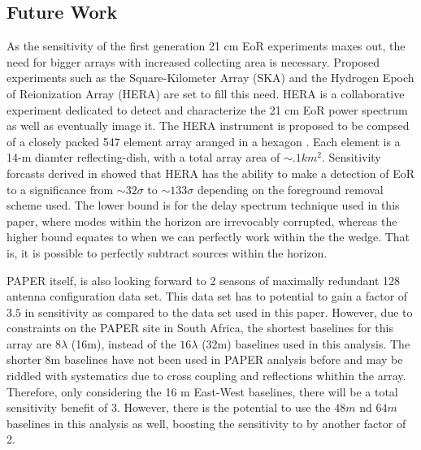 \documentclass[twocolumn,numberedappendix]{emulateapj} \shorttitle{PSA64}
\begin{document}
\subsection{Future Work}
As the sensitivity of the first generation 21 cm EoR experiments maxes out, the
need for bigger arrays with increased collecting area is necessary. Proposed
experiments such as the Square-Kilometer Array (SKA) and the Hydrogen Epoch of
Reionization Array (HERA) are set to fill this need. HERA is a collaborative
experiment dedicated to detect and characterize the 21 cm EoR power spectrum as
well as eventually image it. The HERA instrument is proposed to be compsed of a
closely packed 547 element array aranged in a hexagon \citep{pober_et_al2014}.
Each element is a 14-m diamter reflecting-dish, with a total array area of
$\sim.1km^{2}$. Sensitivity forcasts derived in \cite{pober_et_al2014}
showed that HERA has the ability to make a detection of EoR to a significance
from $\sim32\sigma$ to $\sim133\sigma$ depending on the foreground removal
scheme used. The lower bound is for the delay spectrum technique used in this
paper, where modes within the horizon are irrevocably corrupted, whereas the
higher bound equates to when we can perfectly work within the the wedge. That
is, it is possible to perfectly subtract sources within the horizon.

PAPER itself, is also looking forward to 2 seasons of maximally redundant 128
antenna configuration  data set. This data set has to potential to gain a factor
of $3.5$ in sensitivity as compared to the data set used in this paper. However,
due to constraints on the PAPER site in South Africa, the shortest baselines for
this array are $8\lambda$ (16m), instead of the $16\lambda$ (32m) baselines used
in this analysis. The shorter 8m baselines have not been used in PAPER analysis
before and may be riddled with systematics due to cross coupling and reflections
whithin the array. Therefore, only considering the 16 m East-West baselines,
there will be a total sensitivity benefit of $3$. However, there is the
potential to use the $48m$ nd $64m$ baselines in this analysis as well, boosting
the sensitivity to by another factor of 2.
\end{document}
